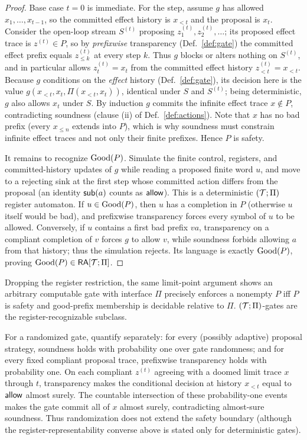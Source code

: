 \begin{proof}
Base case $t=0$ is immediate. For the step, assume $g$ has allowed $x_1,\dots,x_{t-1}$, so the
committed effect history is $x_{<t}$ and the proposal is $x_t$. Consider the open-loop stream
$S^{(t)}$ proposing $z^{(t)}_1,z^{(t)}_2,\dots$; its proposed effect trace is $z^{(t)}\in P$,
so by \emph{prefixwise} transparency (Def.~\ref{def:gate}) the committed effect prefix equals
$z^{(t)}_{\le k}$ at every step $k$. Thus $g$ blocks or alters nothing on $S^{(t)}$, and in
particular allows $z^{(t)}_t=x_t$ from the committed effect history $z^{(t)}_{<t}=x_{<t}$.
Because $g$ conditions on the \emph{effect} history (Def.~\ref{def:gate}), its decision here is
the value $g(x_{<t},x_t,\Pi(x_{<t},x_t))$, identical under $S$ and $S^{(t)}$; being
deterministic, $g$ also allows $x_t$ under $S$. By induction $g$ commits the infinite
effect trace $x\notin P$, contradicting soundness (clause (ii) of Def.~\ref{def:actions}).
Note that $x$ has no bad prefix (every $x_{\le n}$ extends into $P$), which is why soundness
must constrain infinite effect traces and not only their finite prefixes. Hence $P$ is safety.

It remains to recognize $\mathrm{Good}(P)$. Simulate the finite control, registers, and
committed-history updates of $g$ while reading a proposed finite word $u$, and
move to a rejecting sink at the first step whose committed action differs from the proposal (an identity $\mathsf{sub}(a)$ counts as $\mathsf{allow}$). This is a
deterministic $(\mathcal{T};\Pi)$ register automaton. If $u\in\mathrm{Good}(P)$, then $u$ has a
completion in $P$ (otherwise $u$ itself would be bad), and prefixwise transparency
forces every symbol of $u$ to be allowed. Conversely, if $u$ contains a first bad
prefix $va$, transparency on a compliant completion of $v$ forces $g$ to allow
$v$, while soundness forbids allowing $a$ from that history; thus the simulation
rejects. Its language is exactly $\mathrm{Good}(P)$, proving
$\mathrm{Good}(P)\in\mathsf{RA}[\mathcal{T};\Pi]$.
\end{proof}

\begin{remark}
Dropping the register restriction, the same limit-point argument shows an
arbitrary computable gate with interface $\Pi$ precisely enforces a nonempty
$P$ iff $P$ is safety and good-prefix membership is decidable relative to $\Pi$.
$(\mathcal{T};\Pi)$-gates are the register-recognizable subclass.

For a randomized gate, quantify separately: for every (possibly adaptive)
proposal strategy, soundness holds with probability one over gate randomness;
and for every fixed compliant proposal trace, prefixwise transparency holds
with probability one. On each compliant $z^{(t)}$ agreeing with a doomed limit
trace $x$ through $t$, transparency makes the conditional decision at history
$x_{<t}$ equal to $\mathsf{allow}$ almost surely. The countable intersection of these
probability-one events makes the gate commit all of $x$ almost surely,
contradicting almost-sure soundness. Thus randomization does not extend the
safety boundary (although the register-representability converse above is stated
only for deterministic gates).
\end{remark}

